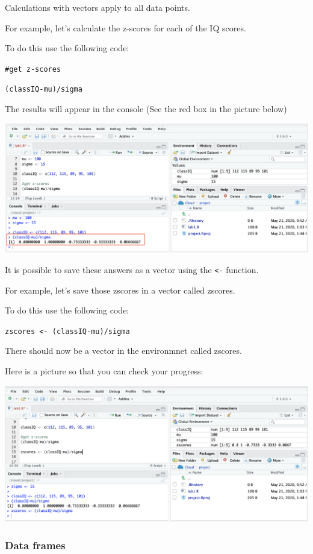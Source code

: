 \documentclass[
]{book}
\begin{document}
Calculations with vectors apply to all data points.

For example, let's calculate the z-scores for each of the IQ scores.

To do this use the following code:

\texttt{\#get\ z-scores}

\texttt{(classIQ-mu)/sigma}

The results will appear in the console (See the red box in the picture below)

\includegraphics{img/zscores.png}

It is possible to save these answers as a vector using the \texttt{\textless{}-} function.

For example, let's save those zscores in a vector called zscores.

To do this use the following code:

\texttt{zscores\ \textless{}-\ (classIQ-mu)/sigma}

There should now be a vector in the environmnet called zscores.

Here is a picture so that you can check your progress:

\includegraphics{img/zsaved.png}

\hypertarget{data-frames}{%
\subsubsection{Data frames}\label{data-frames}}
\end{document}
